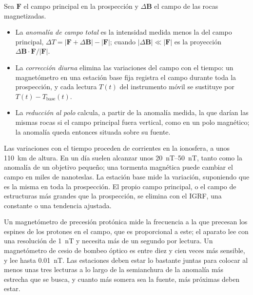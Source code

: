 \begin{definition}\label{def:b3:field-lab-methods-3:magnetic}
Sea $\mathbf{F}$ el campo principal en la prospección y $\Delta\mathbf{B}$
el campo de las rocas magnetizadas.
\begin{itemize}
  \item La \emph{anomalía de campo total} es
        la intensidad medida menos la del campo principal, $\Delta T =
        |\mathbf{F} + \Delta\mathbf{B}| - |\mathbf{F}|$; cuando
        $|\Delta\mathbf{B}| \ll |\mathbf{F}|$ es la proyección
        $\Delta\mathbf{B}\cdot\mathbf{F}/|\mathbf{F}|$.
  \item La \emph{corrección diurna} elimina
        las variaciones del campo con el tiempo: un magnetómetro en una estación base
        fija registra el campo durante toda la prospección, y cada
        lectura $T(t)$ del instrumento móvil se sustituye por $T(t) -
        T_\mathrm{base}(t)$.
  \item La \emph{reducción al polo}
        calcula, a partir de la anomalía medida, la que darían las mismas rocas
        si el campo principal fuera vertical, como en un polo
        magnético; la anomalía queda entonces situada sobre su fuente.
\end{itemize}
\end{definition}

Las variaciones con el tiempo proceden de corrientes en la ionosfera, a unos
\qty{110}{km} de altura. En un día suelen alcanzar unos
\qtyrange{20}{50}{nT}, tanto como la anomalía de un objetivo pequeño; una
tormenta magnética puede cambiar el campo en miles de nanoteslas. La
estación base mide la variación, suponiendo que es la
misma en toda la prospección. El propio campo principal, o el campo de
estructuras más grandes que la prospección, se elimina con el IGRF, una constante
o una tendencia ajustada.

Un magnetómetro de precesión protónica mide la frecuencia a la que precesan
los espines de los protones en el campo, que es proporcional a este; el aparato
lee con una resolución de \qty{1}{nT} y necesita más de un segundo por lectura. Un
magnetómetro de cesio de bombeo óptico es entre diez y cien veces más
sensible, y lee hasta \qty{0.01}{nT}. Las estaciones deben estar lo bastante
juntas para colocar al menos unas tres lecturas a lo largo de la semianchura de la
anomalía más estrecha que se busca, y cuanto más somera sea la fuente, más próximas
deben estar.

